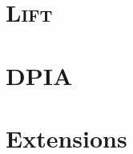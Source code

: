 \documentclass[
  nonacm,
  format=acmsmall,
  screen=true,
  timestamp=true
]{acmart}
\newcommand{\Lift}{\textsc{Lift}\xspace}
\begin{document}
\maketitle

\clearpage
\section{\Lift}






\renewcommand{\readacc}{\mathsf{read}}
\renewcommand{\writeacc}{\mathsf{write}}
\renewcommand{\type}{\mathsf{phrase}}

\clearpage
\section{DPIA}

\newcommand{\ei}{\prim{idx}~n~\dtone~\mathit{xs}~i}
\newcommand{\ea}{\prim{idxAcc}~n~\dttwo~\mathit{out}~i}

\newcommand{\codegenComm}[1]{\textsc{CodeGen}_{\mathsf{comm}}(#1)}
\newcommand{\codegenAcc}[2]{\textsc{CodeGen}_{\mathsf{acc}[#1]}(#2)}
\newcommand{\codegenExp}[2]{\textsc{CodeGen}_{\mathsf{exp}[#1]}(#2)}
\newcommand{\codegenData}[1]{\textsc{CodeGen}_{\mathsf{\datatype}}(#1)}










\clearpage

\section{Extensions}



\end{document}
